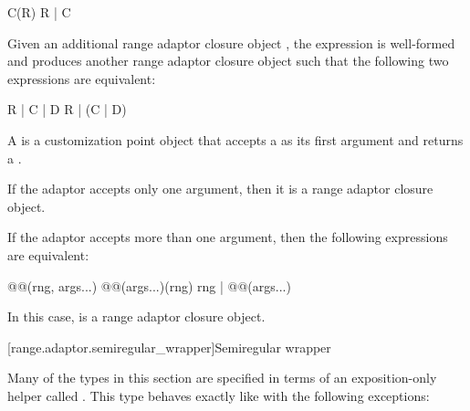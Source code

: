 \begin{codeblock}
C(R)
R | C
\end{codeblock}

Given an additional range adaptor closure object ,
the expression  is well-formed and produces another range adaptor
closure object such that the following two expressions are equivalent:

\begin{codeblock}
R | C | D
R | (C | D)
\end{codeblock}

\pnum
A  is a
customization point object
that accepts a  as its first argument and returns a
.

\pnum
If the adaptor accepts only one argument, then it is a range adaptor closure
object.

\pnum
If the adaptor accepts more than one argument, then the following expressions
are equivalent:

\begin{codeblock}
@@(rng, args...)
@@(args...)(rng)
rng | @@(args...)
\end{codeblock}

In this case,  is a  range adaptor
closure object.

[range.adaptor.semiregular_wrapper]{Semiregular wrapper}

\pnum
Many of the types in this section are specified in terms of an exposition-only
helper called . This type behaves exactly
like  with the following exceptions:

